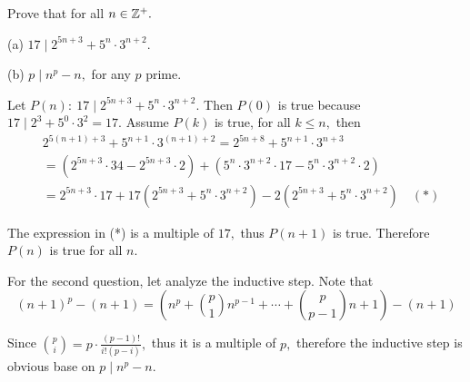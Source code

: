 \documentclass{article}
\begin{document}
\begin{problem}
    Prove that for all $n \in \mathbb Z^+.$

    (a) $17 \mid 2^{5n+3} + 5^n\cdot 3^{n+2}.$

    (b) $p \mid n^p - n,$ for any $p$ prime.
\end{problem}

\begin{soln}
    Let $P(n):\ 17 \mid 2^{5n+3} + 5^n\cdot 3^{n+2}.$ Then $P(0)$ is true because $17 \mid 2^3 + 5^0 \cdot 3^2 = 17.$
    Assume $P(k)$ is true, for all $k \le n,$ then
    \[
        \begin{aligned}
            &2^{5(n+1)+3} + 5^{n+1}\cdot 3^{(n+1)+2} = 2^{5n+8} + 5^{n+1}\cdot 3^{n+3}\\
            &=(2^{5n+3} \cdot 34 - 2^{5n+3} \cdot 2) + (5^n\cdot 3^{n+2} \cdot 17 - 5^n \cdot 3^{n+2} \cdot 2)\\
            &= 2^{5n+3} \cdot 17 + 17(2^{5n+3} + 5^n\cdot 3^{n+2}) - 2(2^{5n+3} + 5^n \cdot 3^{n+2}) \quad (*)
        \end{aligned}
    \]
    
    The expression in (*) is a multiple of $17,$ thus $P(n+1)$ is true.
    Therefore $P(n)$ is true for all $n.$

    For the second question, let analyze the inductive step. Note that
    \[
        (n+1)^p - (n+1) = \left(n^p + \binom{p}{1} n^{p-1} + \cdots + \binom{p}{p-1} n + 1 \right) - (n+1)
    \]

    Since $\binom{p}{i} = p \cdot \frac{(p-1)!}{i!(p-i)},$ thus it is a multiple of $p,$
    therefore the inductive step is obvious base on $p \mid n^p - n.$
\end{soln}
\end{document}

